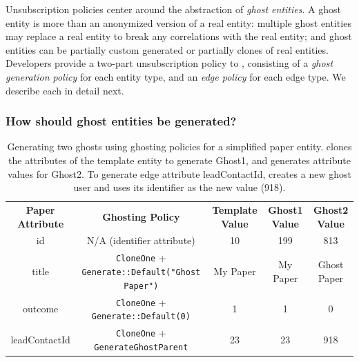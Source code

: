 Unsubscription policies center around the abstraction of \emph{ghost entities}. A ghost entity is
more than an anonymized version of a real entity: multiple ghost
entities may replace a real entity to break any correlations with the real entity; and ghost entities can be
partially custom generated or partially clones of real entities.
Developers provide a two-part unsubscription policy to \proto, consisting of a \emph{ghost
generation policy} for each entity type, and an \emph{edge policy} for each edge type. We describe each in detail next.

\subsubsection{How should ghost entities be generated?}
\label{sec:ghosting}

\begin{table}[t!]
    \centering
    \footnotesize
\begin{tabular}{@{}ccccc@{}}
\textbf{Paper Attribute} & \textbf{Ghosting Policy} & \textbf{Template Value} & \textbf{Ghost1 Value} & \textbf{Ghost2 Value} 
  \\ \cmidrule(r){1-5}
    {id} & N/A (identifier attribute) & 10 & 199 & 813 \\
{title} & \texttt{CloneOne} + \texttt{Generate::Default("Ghost Paper")} & My Paper & My
    Paper & Ghost Paper \\
{outcome} & \texttt{CloneOne} + \texttt{Generate::Default(0)} & 1 & 1 & 0 \\
{leadContactId} & \texttt{CloneOne} + \texttt{GenerateGhostParent} & 23 & 23 & 918 \\
\end{tabular}
    \caption{Generating two ghosts using ghosting policies for a simplified paper entity.
    \proto clones the attributes of the template entity to generate Ghost1, and generates
    attribute values for Ghost2. To generate edge attribute leadContactId, \proto creates a new ghost user and uses its identifier as the new value (918).}
    \label{tab:ghosting}
\end{table}

